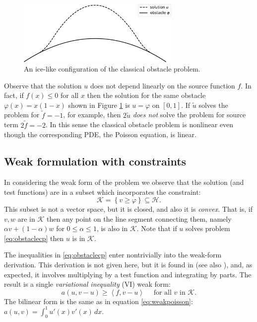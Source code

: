 \documentclass[letterpaper,final,12pt,reqno]{amsart}
\newcommand{\ip}[2]{\left<#1,#2\right>}
\numberwithin{equation}{section}
\numberwithin{figure}{section}
\numberwithin{table}{section}
\begin{document}
\begin{figure}
\includegraphics[width=0.7\textwidth]{fixfigs/icelike.pdf}
\caption{An ice-like configuration of the classical obstacle problem.}
\label{fig:icelike}
\end{figure}

Observe that the solution $u$ does not depend linearly on the source function $f$.  In fact, if $f(x)\le 0$ for all $x$ then the solution for the same obstacle $\varphi(x)=x(1-x)$ shown in Figure \ref{fig:icelike} is $u=\varphi$ on $[0,1]$.  If $\tilde u$ solves the problem for $\tilde f= -1$, for example, then $2\tilde u$ \emph{does not} solve the problem for source term $2\tilde f = -2$.  In this sense the classical obstacle problem is nonlinear even though the corresponding PDE, the Poisson equation, is linear.

\subsection*{Weak formulation with constraints}  In considering the weak form of the problem we observe that the solution (and test functions) are in a subset which incorporates the constraint:
\begin{equation}
\mathcal{K} = \left\{v \ge \varphi\right\} \subseteq \mathcal{H}.  \label{eq:Kdefine}
\end{equation}
This subset is not a vector space, but it is closed, and also it is \emph{convex}.  That is, if $v,w$ are in $\mathcal{K}$ then any point on the line segment connecting them, namely $\alpha v + (1-\alpha) w$ for $0 \le \alpha \le 1$, is also in $\mathcal{K}$.  Note that if $u$ solves problem \eqref{eq:obstaclecp} then $u$ is in $\mathcal{K}$.

The inequalities in \eqref{eq:obstaclecp} enter nontrivially into the weak-form derivation.  This derivation is not given here, but it is found in \cite{KinderlehrerStampacchia1980} (see also \cite[Chapter 12]{Bueler2021}), and, as expected, it involves multiplying by a test function and integrating by parts.  The result is a single \emph{variational inequality} (VI) weak form:
\begin{equation}
  a(u,v-u) \ge \ip{f}{v-u} \quad \text{ for all } v \text{ in } \mathcal{K}. \label{eq:obstaclevi}
\end{equation}
The bilinear form is the same as in equation \eqref{eq:weakpoisson}: $a(u,v) = \int_0^1 u'(x) v'(x)\,dx$.
\end{document}

